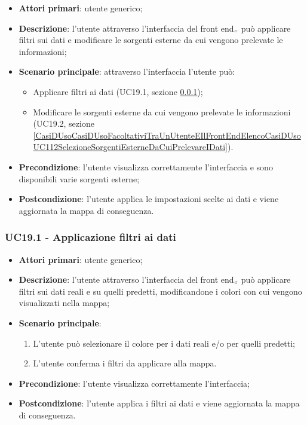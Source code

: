 \begin{itemize}
	\item \textbf{Attori primari}: utente generico;
	\item \textbf{Descrizione}: l'utente attraverso l'interfaccia del front end$_{\scaleto{G}{3pt}}$ può applicare filtri sui dati e modificare le sorgenti esterne da cui vengono prelevate le informazioni;
	\item \textbf{Scenario principale}: attraverso l'interfaccia l'utente può:
	\begin{itemize}
		\item Applicare filtri ai dati (UC19.1, sezione  \ref{CasiDUsoCasiDUsoFacoltativiTraUnUtenteEIlFrontEndElencoCasiDUsoUC111ApplicazioneFiltriAiDati});
		\item Modificare le sorgenti esterne da cui vengono prelevate le informazioni (UC19.2, sezione \ref{CasiDUsoCasiDUsoFacoltativiTraUnUtenteEIlFrontEndElencoCasiDUsoUC112SelezioneSorgentiEsterneDaCuiPrelevareIDati}).
	\end{itemize}
	\item \textbf{Precondizione}: l'utente visualizza correttamente l'interfaccia e sono disponibili varie sorgenti esterne;
	\item \textbf{Postcondizione}: l'utente applica le impostazioni scelte ai dati e viene aggiornata la mappa di conseguenza.
\end{itemize}

\subsubsection{UC19.1 - Applicazione filtri ai dati}\label{CasiDUsoCasiDUsoFacoltativiTraUnUtenteEIlFrontEndElencoCasiDUsoUC111ApplicazioneFiltriAiDati}
\begin{itemize}
	\item \textbf{Attori primari}: utente generico;
	\item \textbf{Descrizione}: l'utente attraverso l'interfaccia del front end$_{\scaleto{G}{3pt}}$ può applicare filtri sui dati reali e su quelli predetti, modificandone i colori con cui vengono visualizzati nella mappa;
	\item \textbf{Scenario principale}:
	\begin{enumerate}
		\item L'utente può selezionare il colore per i dati reali e/o per quelli predetti;
		\item L'utente conferma i filtri da applicare alla mappa.
	\end{enumerate}
	\item \textbf{Precondizione}: l'utente visualizza correttamente l'interfaccia;
	\item \textbf{Postcondizione}: l'utente applica i filtri ai dati e viene aggiornata la mappa di conseguenza.
\end{itemize}

